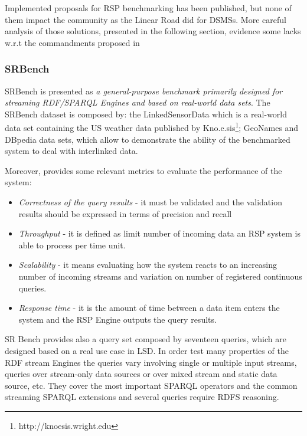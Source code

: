 Implemented proposals for RSP benchmarking has been published, but none of them impact the community as the Linear Road did for DSMSs. More careful analysis of those solutions, presented in the following section, evidence some lacks w.r.t the commandments proposed in \cite{DBLP:conf/esws/ScharrenbachUMVB13} 

\subsubsection{SRBench}\label{sec:srbench}

SRBench is presented as \textit{a general-purpose benchmark primarily designed for streaming RDF/SPARQL Engines and based on real-world data sets}\cite{Zhang2012}. The SRBench dataset is composed by: the LinkedSensorData  which  is a real-world data set containing the US weather data published by Kno.e.sis\footnote{ http://knoesis.wright.edu};  GeoNames and DBpedia data sets, which allow to demonstrate the ability of the benchmarked system to deal with interlinked data.

Moreover, \cite{Zhang2012} provides some relevant metrics to evaluate the performance of the system: 
\begin{itemize}
\item \textit{Correctness of the query results} - it must be validated and the validation results should be expressed in terms of precision and recall
\item \textit{Throughput} - it is defined as limit number of incoming data an RSP system is able to process per time unit.
\item \textit{Scalability} - it means evaluating how the system reacts to an increasing number of incoming streams and variation on number of registered continuous queries.
\item \textit{Response time} - it is the amount of time between a data item enters the system and the RSP Engine outputs the query results.
\end{itemize}

SR Bench provides also a query set composed by seventeen queries, which are designed based on a real use case in LSD. In order test many properties of the RDF stream Engines the queries vary involving single or multiple input streams, queries over stream-only data sources or over mixed stream and static data source, etc. They cover the most important SPARQL operators and the common streaming SPARQL extensions and several queries require RDFS reasoning.

